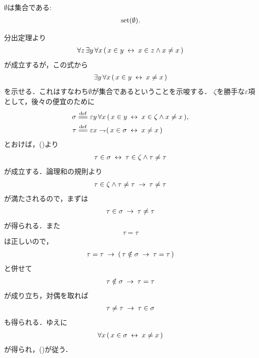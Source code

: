 	\begin{screen}
		\begin{thm}\label{thm:emptyset_is_a_set}
			$\emptyset$は集合である:
			\begin{align}
				\operatorname*{set} (\emptyset).
			\end{align}
		\end{thm}
	\end{screen}
	
	\begin{sketch}
		分出定理より
		\begin{align}
			\forall z\, \exists y\, \forall x\,
			(\, x \in y \hspace{0.25em}\leftrightarrow\hspace{0.25em} x \in z \wedge x \neq x\, )
			\label{fom:thm_emptyset_is_a_set_1}
		\end{align}
		が成立するが，この式から
		\begin{align}
			\exists y\, \forall x\, (\, x \in y \hspace{0.25em}\leftrightarrow\hspace{0.25em} x \neq x\, )
			\label{fom:thm_emptyset_is_a_set_2}
		\end{align}
		を示せる．これはすなわち$\emptyset$が集合であるということを示唆する．
		$\zeta$を勝手な$\varepsilon$項として，後々の便宜のために
		\begin{align}
			\sigma &\defeq \varepsilon y\, \forall x\,
			(\, x \in y \lrarrow x \in \zeta \wedge x \neq x\, ), \\
			\tau &\defeq \varepsilon x \negation
			(\, x \in \sigma \lrarrow x \neq x\, )
		\end{align}
		とおけば，()より
		\begin{align}
			\tau \in \sigma \hspace{0.25em}\leftrightarrow\hspace{0.25em} \tau \in \zeta \wedge \tau \neq \tau
		\end{align}
		が成立する．論理和の規則より
		\begin{align}
			\tau \in \zeta \wedge \tau \neq \tau \hspace{0.25em}\rightarrow\hspace{0.25em} \tau \neq \tau
		\end{align}
		が満たされるので，まずは
		\begin{align}
			\tau \in \sigma \hspace{0.25em}\rightarrow\hspace{0.25em} \tau \neq \tau
		\end{align}
		が得られる．また
		\begin{align}
			\tau = \tau
		\end{align}
		は正しいので，
		\begin{align}
			\tau = \tau \hspace{0.25em}\rightarrow\hspace{0.25em} (\, \tau \notin \sigma \hspace{0.25em}\rightarrow\hspace{0.25em}
			\tau = \tau\, )
		\end{align}
		と併せて
		\begin{align}
			\tau \notin \sigma \hspace{0.25em}\rightarrow\hspace{0.25em} \tau = \tau
		\end{align}
		が成り立ち，対偶を取れば
		\begin{align}
			\tau \neq \tau \hspace{0.25em}\rightarrow\hspace{0.25em} \tau \in \sigma
		\end{align}
		も得られる．ゆえに
		\begin{align}
			\forall x\, (\, x \in \sigma \hspace{0.25em}\leftrightarrow\hspace{0.25em} x \neq x\, )
		\end{align}
		が得られ，()が従う．
		\QED
	\end{sketch}
	
